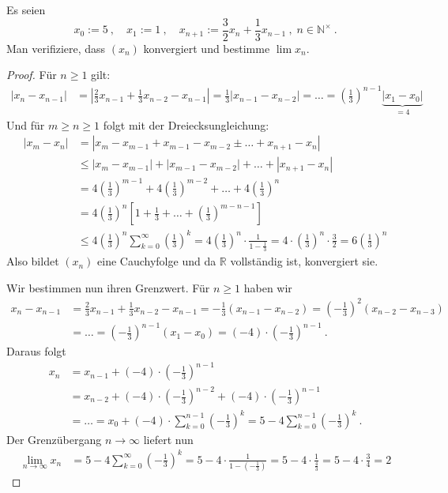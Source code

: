 \begin{aufgabe}
Es seien
\[
x_0 := 5 \ , \quad x_1 := 1 \ , \quad  x_{n+1} := \frac 3 2 x_{n} + \frac 1 3 x_{n-1} \ ,
 \; n \in \mathbb N^\times \ .
\]
Man verifiziere, dass $(x_n)$ konvergiert und bestimme $\lim x_n$.
\end{aufgabe}
\begin{proof}
Für $n \geq 1$ gilt:
\begin{align*}
| x_n - x_{n-1} | &= \left| \frac 2 3 x_{n-1} + \frac 1 3 x_{n-2} - x_{n-1} \right|
	= \frac 1 3 | x_{n-1} - x_{n-2} | = \ldots 
	= \left( \frac 1 3 \right)^{n-1} \underbrace{|x_1 - x_0 |}_{=4}
\end{align*}
Und für $m \geq n \geq 1$ folgt mit der Dreiecksungleichung:
\begin{align*}
|x_m - x_n| &= |x_m - x_{m-1} + x_{m-1} - x_{m-2} \pm \ldots + x_{n+1} - x_n| \\
	&\leq | x_m - x_{m-1} | + | x_{m-1} - x_{m-2}| + \ldots + |x_{n+1} - x_n| \\
	&= 4 \left( \frac 1 3 \right)^{m-1} + 4 \left( \frac 1 3 \right)^{m-2} + \ldots + 
	4 \left( \frac 1 3 \right)^{n} \\
	&= 4 \left( \frac 1 3 \right)^{n} \left[ 1 + \frac 1 3 + \ldots 
	+ \left( \frac 1 3 \right)^{m-n-1} \right] \\
	&\leq 4 \left( \frac 1 3 \right)^n \sum_{k=0}^\infty \left( \frac 1 3 \right)^k
	= 4 \left( \frac 1 3 \right)^n \cdot \frac{1}{1- \frac 1 3}
	= 4 \cdot \left( \frac 1 3 \right)^n \cdot \frac 3 2 
	= 6 \left( \frac 1 3 \right)^n
\end{align*}
Also bildet $(x_n)$ eine Cauchyfolge und da $\mathbb R$ vollständig ist, konvergiert sie.

Wir bestimmen nun ihren Grenzwert.
Für $n \geq 1$ haben wir
\begin{align*}
x_n - x_{n-1} &= \frac 2 3 x_{n-1} + \frac 1 3 x_{n-2} - x_{n-1}
	= - \frac 1 3 \left( x_{n-1} - x_{n-2}\right)
	= \left( - \frac 1 3 \right)^2 \left( x_{n-2} - x_{n-3} \right) \\
	&= \ldots = \left( - \frac 1 3 \right)^{n-1} \left( x_1 - x_0 \right)
	= (-4) \cdot \left( - \frac 1 3 \right)^{n-1} \ .
\end{align*}
Daraus folgt
\begin{align*}
x_n &= x_{n-1} + (-4) \cdot \left( - \frac 1 3 \right)^{n-1} \\
	&= x_{n-2} + (-4) \cdot \left( - \frac 1 3 \right)^{n-2} 
	+ (-4) \cdot \left( - \frac 1 3 \right)^{n-1} \\
	&= \ldots = x_0 + (-4) \cdot \sum_{k=0}^{n-1} \left( - \frac 1 3 \right)^k
	= 5 - 4 \sum_{k=0}^{n-1} \left( - \frac 1 3 \right)^k \ .
\end{align*}
Der Grenzübergang $n \to \infty$ liefert nun
\begin{align*}
\lim_{n \to \infty} x_n
	&= 5 - 4 \sum_{k=0}^\infty \left( - \frac 1 3 \right)^k
	= 5 - 4 \cdot \frac{1}{1 - \left( - \frac 1 3  \right)}
	= 5 - 4 \cdot \frac{1}{\frac 4 3}
	= 5 - 4 \cdot \frac 3 4 = 2
\end{align*}

\end{proof}



